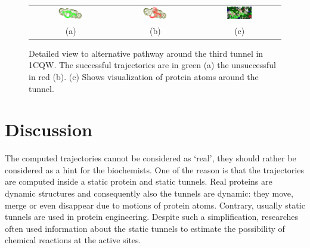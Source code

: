 \documentclass[letterpaper, 10 pt, conference]{ieeeconf} %
\begin{document}
\begin{figure}
\centering
{
\renewcommand{\tabcolsep}{0pt}
\begin{tabular}{ccc}
\includegraphics[width=0.325\textwidth]{fig/tunne4ac}& 
\includegraphics[width=0.325\textwidth]{fig/tunne4bc} & 
\includegraphics[width=0.325\textwidth]{fig/tunne4cc} \\
(a) & (b) & (c)                        
\end{tabular}
}
\caption{\label{fig::detail}
    Detailed view to alternative pathway around the third tunnel in 1CQW.
    The successful trajectories are in green (a) the unsuccessful in red (b).
    (c) Shows visualization of protein atoms around the tunnel.
}
\end{figure}





\section{Discussion}


The computed trajectories cannot be considered as `real', they should rather be considered as a hint for the biochemists.
One of the reason is that the trajectories are computed inside a static protein and static tunnels.
Real proteins are dynamic structures and consequently also the tunnels are dynamic: they move, merge or even disappear due to motions of protein atoms.
Contrary, usually static tunnels are used in protein engineering.
Despite such a simplification, researches often used information about the static tunnels  to estimate the possibility of chemical reactions
at the active sites.
\end{document}
